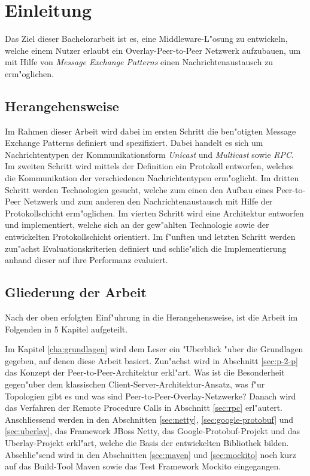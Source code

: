 \chapter{Einleitung}
\label{cha:einleitung}

Das Ziel dieser Bachelorarbeit ist es, eine Middleware-L"osung zu entwickeln, welche einem Nutzer erlaubt ein Overlay-Peer-to-Peer Netzwerk aufzubauen, um mit Hilfe von \emph{Message Exchange Patterns} einen Nachrichtenaustausch zu erm"oglichen.

\section{Herangehensweise}

Im Rahmen dieser Arbeit wird dabei im ersten Schritt die ben"otigten Message Exchange Patterns definiert und spezifiziert. Dabei handelt es sich um Nachrichtentypen der Kommunikationsform \emph{Unicast} und \emph{Multicast} sowie \emph{RPC}. Im zweiten Schritt wird mittels der Definition ein Protokoll entworfen, welches die Kommunikation der verschiedenen Nachrichtentypen erm"oglicht. Im dritten Schritt werden Technologien gesucht, welche zum einen den Aufbau eines Peer-to-Peer Netzwerk und zum anderen den Nachrichtenaustausch mit Hilfe der Protokollschicht erm"oglichen. Im vierten Schritt wird eine Architektur entworfen und implementiert, welche sich an der gew"ahlten Technologie sowie der entwickelten Protokollschicht orientiert. Im f"unften und letzten Schritt werden zun"achst Evaluationskriterien definiert und schlie"slich die Implementierung anhand dieser auf ihre Performanz evaluiert. 

\section{Gliederung der Arbeit}
Nach der oben erfolgten Einf"uhrung in die Herangehensweise, ist die Arbeit im Folgenden in 5 Kapitel aufgeteilt.

Im Kapitel \ref{cha:grundlagen} wird dem Leser ein "Uberblick "uber die Grundlagen gegeben, auf denen diese Arbeit basiert. Zun"achst wird in Abschnitt \ref{sec:p-2-p} das Konzept der Peer-to-Peer-Architektur erkl"art. Was ist die Besonderheit gegen"uber dem klassischen Client-Server-Architektur-Ansatz, was f"ur Topologien gibt es und was sind Peer-to-Peer-Overlay-Netzwerke? Danach wird das Verfahren der Remote Procedure Calls in Abschnitt \ref{sec:rpc} erl"autert. Anschliessend werden in den Abschnitten \ref{sec:netty}, \ref{sec:google-protobuf} und \ref{sec:uberlay}, das Framework JBoss Netty, das Google-Protobuf-Projekt und das Uberlay-Projekt erkl"art, welche die Basis der entwickelten Bibliothek bilden. Abschlie"send wird in den Abschnitten \ref{sec:maven} und \ref{sec:mockito} noch kurz auf das Build-Tool Maven sowie das Test Framework Mockito eingegangen.

